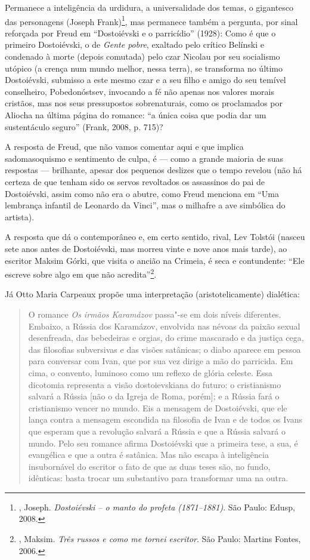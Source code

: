 Permanece a inteligência da urdidura, a universalidade dos temas, o
gigantesco das personagens (Joseph Frank)\footnote{, Joseph.
  \emph{Dostoiévski -- o manto do profeta (1871--1881)}. São Paulo:
  Edusp, 2008.}, mas permanece também a pergunta, por sinal reforçada por
Freud em ``Dostoiévski e o parricídio'' (1928): Como é que o primeiro
Dostoiévski, o de \emph{Gente pobre}, exaltado pelo crítico Belínski e
condenado à morte (depois comutada) pelo czar Nicolau  por seu
socialismo utópico (a crença num mundo melhor, nessa terra), se
transforma no último Dostoiévski, submisso a este mesmo czar e a seu
filho e amigo do seu temível conselheiro, Pobedonóstsev, invocando a fé
não apenas nos valores morais cristãos, mas nos seus pressupostos
sobrenaturais, como os proclamados por Aliocha na última página do
romance: ``a única coisa que podia dar um sustentáculo seguro'' (Frank,
2008, p. 715)?

A resposta de Freud, que não vamos comentar aqui e que implica
sadomasoquismo e sentimento de culpa, é --- como a grande maioria de suas
respostas --- brilhante, apesar dos pequenos deslizes que o tempo revelou
(não há certeza de que tenham sido os servos revoltados os assassinos do
pai de Dostoiévski, assim como não era o abutre, como Freud menciona em
``Uma lembrança infantil de Leonardo da Vinci'', mas o milhafre a ave
simbólica do artista).

A resposta que dá o contemporâneo e, em certo sentido, rival, Lev
Tolstói (nasceu sete anos antes de Dostoiévski, mas morreu vinte e nove
anos mais tarde), ao escritor Maksim Górki, que visita o ancião na
Crimeia, é seca e contundente: ``Ele escreve sobre algo em que não
acredita''\footnote{, Maksim. \emph{Três russos e como me tornei
  escritor}. São Paulo: Martins Fontes, 2006.}.

Já Otto Maria Carpeaux propõe uma interpretação (aristotelicamente)
dialética:

\begin{quote}
O romance \emph{Os irmãos Karamázov} passa"-se em dois níveis diferentes.
Embaixo, a Rússia dos Karamázov, envolvida nas névoas da paixão sexual
desenfreada, das bebedeiras e orgias, do crime mascarado e da justiça
cega, das filosofias subversivas e das visões satânicas; o diabo aparece
em pessoa para conversar com Ivan, que por sua vez dirige a mão do
parricida. Em cima, o convento, luminoso como um reflexo de glória
celeste. Essa dicotomia representa a visão dostoievskiana do futuro: o
cristianismo salvará a Rússia [não o da Igreja de Roma, porém]; e a
Rússia fará o cristianismo vencer no mundo. Eis a mensagem de
Dostoiévski, que ele lança contra a mensagem escondida na filosofia de
Ivan e de todos os Ivans que esperam que a revolução salvará a Rússia e
que a Rússia salvará o mundo. Pelo seu romance afirma Dostoiévski que a
primeira tese, a sua, é evangélica e que a outra é satânica. Mas não
escapa à inteligência insubornável do escritor o fato de que as duas
teses são, no fundo, idênticas: basta trocar um substantivo para
transformar uma na outra.
\end{quote}

